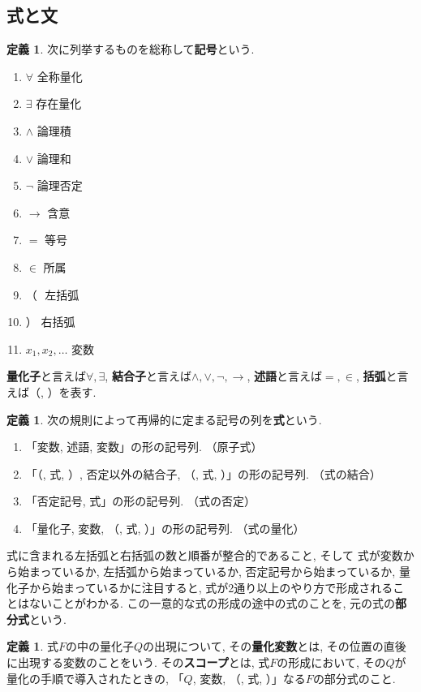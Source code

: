 \documentclass[a4paper]{bxjsarticle}
\theoremstyle{definition}
\newtheorem{defn}[thm]{定義}
\begin{document}
    \subsection{式と文}
    \begin{defn}
        次に列挙するものを総称して\textbf{記号}という.
        \begin{enumerate}
            \item $\forall$ 全称量化
            \item $\exists$ 存在量化
            \item $\land$ 論理積
            \item $\lor$ 論理和
            \item $\lnot$ 論理否定
            \item $\to$ 含意
            \item $=$ 等号
            \item $\in$ 所属
            \item  （ \,\,左括弧
            \item  ） 右括弧
            \item $x_1, x_2, \dots$ 変数
        \end{enumerate}
        \textbf{量化子}と言えば$\forall, \exists$,
        \textbf{結合子}と言えば$\land, \lor, \lnot, \to$, \textbf{述語}と言えば$=, \in$, \textbf{括弧}と言えば（, ）を表す.
    \end{defn}
    \begin{defn}    
        次の規則によって再帰的に定まる記号の列を\textbf{式}という.
        \begin{enumerate}
            \item 「変数, 述語, 変数」の形の記号列. （原子式）
            \item 「（, 式, ）, 否定以外の結合子, （, 式, ）」の形の記号列. （式の結合）
            \item 「否定記号, 式」の形の記号列. （式の否定）
            \item 「量化子, 変数, （, 式, ）」の形の記号列. （式の量化）
        \end{enumerate}
        式に含まれる左括弧と右括弧の数と順番が整合的であること, そして        式が変数から始まっているか, 左括弧から始まっているか, 否定記号から始まっているか, 量化子から始まっているかに注目すると, 式が2通り以上のやり方で形成されることはないことがわかる. この一意的な式の形成の途中の式のことを, 元の式の\textbf{部分式}という.
    \end{defn}
    \begin{defn}
        式$F$の中の量化子$Q$の出現について, その\textbf{量化変数}とは, その位置の直後に出現する変数のことをいう.  その\textbf{スコープ}とは, 式$F$の形成において, その$Q$が量化の手順で導入されたときの, 「$Q$, 変数, （, 式, ）」なる$F$の部分式のこと.
    \end{defn}
\end{document}
